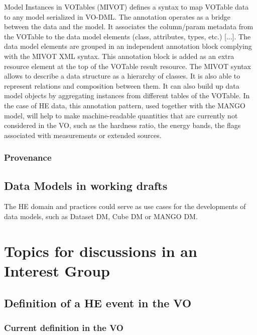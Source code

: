 \documentclass[11pt,a4paper]{ivoa}
\begin{document}
Model Instances in VOTables (MIVOT) defines a syntax to map VOTable data to any model serialized in VO-DML. The annotation operates as a bridge between the data and the model. It associates the column/param metadata from the VOTable to the data model elements (class, attributes, types, etc.) [...]. The data model elements are grouped in an independent annotation block complying with the MIVOT XML syntax. This annotation block is added as an extra resource element at the top of the VOTable result resource. The MIVOT syntax allows to describe a data structure as a hierarchy of classes. It is also able to represent relations and composition between them. It can also build up data model objects by aggregating instances from different tables of the VOTable.
In the case of HE data, this annotation pattern, used together with the MANGO model, will help to make machine-readable quantities that are currently not considered in the VO, such as the hardness ratio, the energy bands, the flags associated with measurements or  extended sources.




\subsubsection{Provenance}



\subsection{Data Models in working drafts}

The HE domain and practices could serve as use cases for the developments of data models, such as Dataset DM, Cube DM or MANGO DM.


\section{Topics for discussions in an Interest Group}


\subsection{Definition of a HE event in the VO}
\label{sec:event-bundlle-or-list}

\subsubsection{Current definition in the VO}
\end{document}
